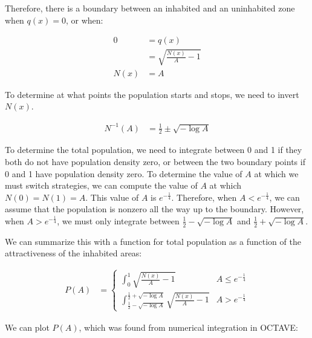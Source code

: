\documentclass{article}
\begin{document}
Therefore, there is a boundary between an inhabited and an uninhabited
	zone when $q(x) = 0$, or when:

\begin{align}
	0 & = q(x) \nonumber \\
	& = \sqrt{ \frac{N(x)}{A} - 1} \nonumber \\
	N(x) & = A 
\end{align}

To determine at what points the population starts and stops, we need 
	to invert $N(x)$.

\begin{align}
	N^{-1}(A) & = \frac 12 \pm \sqrt{ - \log A } 
\end{align}

To determine the total population, we need to integrate between 0 and
	1 if they both do not have population density zero, 
	or between the two boundary points if 0 and 1 have population density
	zero.
To determine the value of $A$ at which we must switch strategies,
	we can compute the value of $A$ at which $N(0) = N(1) = A$.
This value of $A$ is $e^{- \frac 1 4}$.
Therefore, when $A < e^{- \frac 1 4}$, we can assume that the population
	is nonzero all the way up to the boundary.
However, when $A > e^{- \frac 1 4}$, we must only integrate between
	$ \frac 1 2 - \sqrt{ - \log A}$ and $\frac 1 2 + \sqrt{ - \log A}$.

We can summarize this with a function for total population as a function
	of the attractiveness of the inhabited areas:

\begin{align}
P(A) & = \begin{cases}
\int_0^1 \sqrt{ \frac{N(x)}{A} - 1} & A \leq e^{- \frac 1 4} \\
\int_{\frac 1 2 - \sqrt{ - \log A}}^{\frac 12 + \sqrt{ -\log A}}
	\sqrt{ \frac{N(x)}{A} - 1}
	& A > e^{- \frac 1 4} 
\end{cases}
\end{align}

We can plot $P(A)$, which was found from numerical integration in OCTAVE:

\Pindividual
{}
\end{document}
